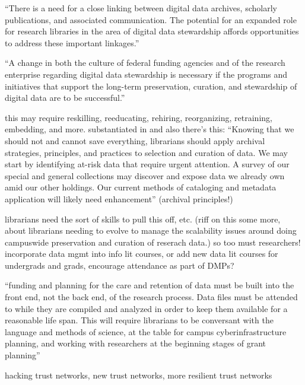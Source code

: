 \documentclass{acm_proc_article-sp}
\begin{document}
``There is a need for a close linking between digital data archives,
scholarly publications, and associated communication. The potential
for an expanded role for research libraries in the area of digital
data stewardship affords opportunities to address these important
linkages.'' \cite{arl:stewardship}

``A change in both the culture of federal funding agencies
and of the research enterprise regarding digital data stewardship is
necessary if the programs and initiatives that support the long-term
preservation, curation, and stewardship of digital data are to be
successful.'' \cite{arl:stewardship}

this may require reskilling, reeducating, rehiring, reorganizing,
retraining, embedding, and more. substantiated in \cite{jisc:deluge}
and also there's this: ``Knowing that we should not and cannot save
everything, librarians should apply archival strategies, principles,
and practices to selection and curation of data. We may start by
identifying at-risk data that require urgent attention. A survey of
our special and general collections may discover and expose data we
already own amid our other holdings. Our current methods of cataloging
and metadata application will likely need enhancement''
\cite{ogburn:imperative} (archival principles!)

librarians need the sort of skills to pull this off, etc. (riff on
this some more, about librarians needing to evolve to manage the
scalability issues around doing campuswide preservation and curation
of reserach data.) so too must researchers!  incorporate data mgmt
into info lit courses, or add new data lit courses for undergrads and
grads, encourage attendance as part of DMPs?

``funding and planning for the care and retention of data must be
built into the front end, not the back end, of the research
process. Data files must be attended to while they are compiled and
analyzed in order to keep them available for a reasonable life
span. This will require librarians to be conversant with the language
and methods of science, at the table for campus cyberinfrastructure
planning, and working with researchers at the beginning stages of
grant planning'' \cite{ogburn:imperative}

hacking trust networks, new trust networks, more resilient trust networks

{}



\end{document}
